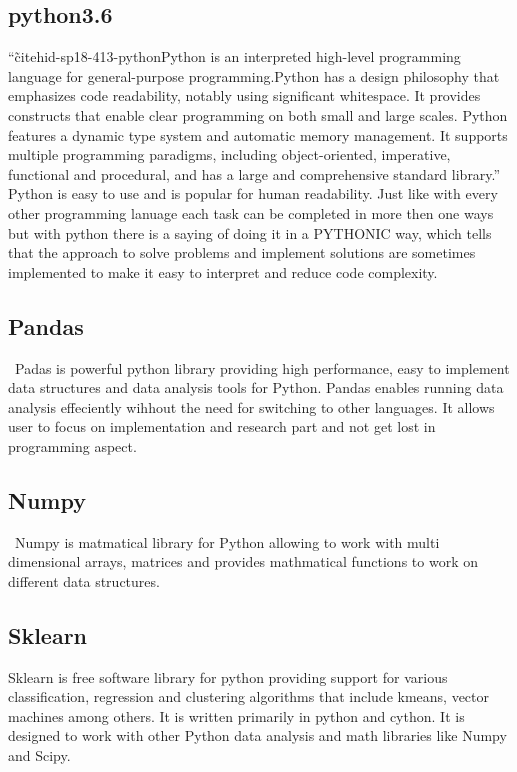\subsection{python3.6}
``\~cite{hid-sp18-413-python}Python is an interpreted high-level programming language for
general-purpose programming.Python has a design philosophy that
emphasizes code readability, notably using significant whitespace. It
provides constructs that enable clear programming on both small and
large scales. Python features a dynamic type system and automatic
memory management. It supports multiple programming paradigms,
including object-oriented, imperative, functional and procedural, and
has a large and comprehensive standard library.'' Python is easy to use
and is popular for human readability. Just like with every other
programming lanuage each task can be completed in more then one ways
but with python there is a saying of doing it in a PYTHONIC way, which
tells that the approach to solve problems and implement solutions are
sometimes implemented to make it easy to interpret and reduce code complexity.

\subsection{Pandas}
~\cite{hid-sp18-413-pandas}Padas is powerful python library providing high performance, easy to
implement data structures and data analysis tools for Python. Pandas
enables running data analysis effeciently wihhout the need for
switching to other languages. It allows user to focus on
implementation and research part and not get lost in programming aspect.

\subsection{Numpy}
~\cite{}Numpy is matmatical library for Python allowing to work with multi
dimensional arrays, matrices and provides mathmatical functions to
work on different data structures. 

\subsection{Sklearn}
Sklearn is free software library for python providing support for
various classification, regression and clustering algorithms that
include kmeans, vector machines among others. It is written primarily
in python and cython. It is designed to work with other Python data
analysis and math libraries like Numpy and Scipy.


